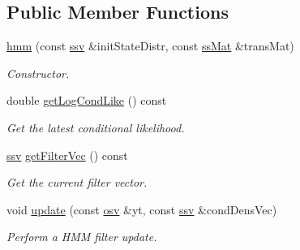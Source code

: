 \subsection*{Public Member Functions}
\begin{DoxyCompactItemize}
\item 
\hyperlink{classpf_1_1hmm_a17382f741bd3f7c3729bcabdb2764dcf}{hmm} (const \hyperlink{classpf_1_1cf__filter_a448f675e130ac4b340e2c3e545673d0d}{ssv} \&init\+State\+Distr, const \hyperlink{classpf_1_1hmm_aa6e481316a30758d0eae33dbc8b5e8b5}{ss\+Mat} \&trans\+Mat)
\begin{DoxyCompactList}\small\item\em Constructor. \end{DoxyCompactList}\item 
double \hyperlink{classpf_1_1hmm_a61628b522c0eb71e9cf68d6956893169}{get\+Log\+Cond\+Like} () const 
\begin{DoxyCompactList}\small\item\em Get the latest conditional likelihood. \end{DoxyCompactList}\item 
\hyperlink{classpf_1_1cf__filter_a448f675e130ac4b340e2c3e545673d0d}{ssv} \hyperlink{classpf_1_1hmm_aa49d415c2bf87b87b1b95ab83f4dc830}{get\+Filter\+Vec} () const 
\begin{DoxyCompactList}\small\item\em Get the current filter vector. \end{DoxyCompactList}\item 
void \hyperlink{classpf_1_1hmm_a007ccf4612b26ca13b8bec2535171859}{update} (const \hyperlink{classpf_1_1cf__filter_ace17376128bb73ee73ff1b5c4972b317}{osv} \&yt, const \hyperlink{classpf_1_1cf__filter_a448f675e130ac4b340e2c3e545673d0d}{ssv} \&cond\+Dens\+Vec)
\begin{DoxyCompactList}\small\item\em Perform a H\+MM filter update. \end{DoxyCompactList}\end{DoxyCompactItemize}
